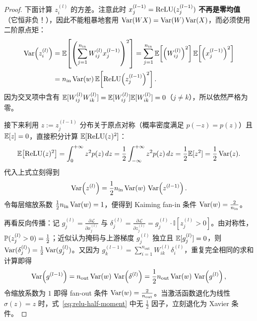 \begin{thmBox}
\begin{proof}
下面计算 $z^{(l)}_i$ 的方差。注意此时 $x^{(l-1)}_j = \operatorname{ReLU}(z^{(l-1)}_j)$ \textbf{不再是零均值}（它恒非负！），因此不能粗暴地套用 $\operatorname{Var}(WX) = \operatorname{Var}(W)\operatorname{Var}(X)$，而必须使用二阶原点矩：
\begin{align*}
  \operatorname{Var}\!\left(z^{(l)}_i\right)
  &= \mathbb{E}\!\left[\left(\sum_{j=1}^{n_{\text{in}}} W^{(l)}_{ij} x^{(l-1)}_j\right)^2\right]
  = \sum_{j=1}^{n_{\text{in}}} \mathbb{E}\!\left[\left(W^{(l)}_{ij}\right)^2\right] \mathbb{E}\!\left[\left(x^{(l-1)}_j\right)^2\right] \\
  &= n_{\text{in}} \operatorname{Var}(w)\, \mathbb{E}\!\left[\operatorname{ReLU}\!\left(z^{(l-1)}_j\right)^2\right].
\end{align*}
因为交叉项中含有 $\mathbb{E}[W^{(l)}_{ij} W^{(l)}_{ik}] = \mathbb{E}[W^{(l)}_{ij}]\mathbb{E}[W^{(l)}_{ik}] = 0$（$j \neq k$），所以依然严格为零。

接下来利用 $z := z^{(l-1)}_j$ 分布关于原点对称（概率密度满足 $p(-z) = p(z)$）且 $\mathbb{E}[z] = 0$，直接积分计算 $\mathbb{E}[\operatorname{ReLU}(z)^2]$：
\[
  \mathbb{E}\!\left[\operatorname{ReLU}(z)^2\right]
  = \int_{0}^{+\infty} z^2 p(z)\,dz
  = \frac{1}{2} \int_{-\infty}^{+\infty} z^2 p(z)\,dz
  = \frac{1}{2}\mathbb{E}[z^2] = \frac{1}{2}\operatorname{Var}(z).
\]
代入上式立刻得到
\[
  \operatorname{Var}\!\left(z^{(l)}\right) = \frac{1}{2} n_{\text{in}} \operatorname{Var}(w)\,\operatorname{Var}\!\left(z^{(l-1)}\right).
\]
令每层缩放系数 $\frac{1}{2} n_{\text{in}} \operatorname{Var}(w) = 1$，便得到 Kaiming fan-in 条件 $\operatorname{Var}(w) = \frac{2}{n_{\text{in}}}$。

再看反向传播：记 $g^{(l)}_j = \frac{\partial \mathcal{L}}{\partial x^{(l)}_j}$ 与 $\delta^{(l)}_j = \frac{\partial \mathcal{L}}{\partial z^{(l)}_j} = g^{(l)}_j \cdot \mathbb{I}[z^{(l)}_j > 0]$。由对称性，$\mathbb{P}(z^{(l)}_j > 0) = \frac{1}{2}$；近似认为掩码与上游梯度 $g^{(l)}_j$ 独立且 $\mathbb{E}[g^{(l)}_j] = 0$，则 $\operatorname{Var}(\delta^{(l)}_j) = \frac{1}{2}\operatorname{Var}(g^{(l)}_j)$。又因为 $g^{(l-1)}_k = \sum_{i=1}^{n_{\text{out}}} W^{(l)}_{ik} \delta^{(l)}_i$，重复完全相同的求和计算即得
\[
  \operatorname{Var}\!\left(g^{(l-1)}\right) = n_{\text{out}} \operatorname{Var}(w)\,\operatorname{Var}\!\left(\delta^{(l)}\right) = \frac{1}{2} n_{\text{out}} \operatorname{Var}(w)\,\operatorname{Var}\!\left(g^{(l)}\right),
\]
令缩放系数为 $1$ 即得 fan-out 条件 $\operatorname{Var}(w) = \frac{2}{n_{\text{out}}}$。当激活函数退化为线性 $\sigma(z)=z$ 时，式~\eqref{eq:relu-half-moment} 中无 $\frac{1}{2}$ 因子，立刻退化为 Xavier 条件。
\end{proof}
\end{thmBox}

